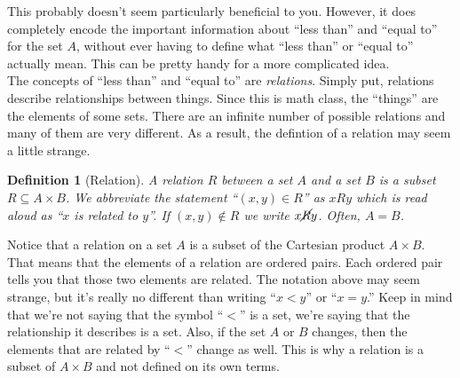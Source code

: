 \documentclass[12 pt]{article}
\newcommand{\esub}{\subseteq}
\theoremstyle{definition}
\theoremstyle{plain}
\theoremstyle{mytheorem}
\theoremstyle{myexample}
\theoremstyle{mydefinition}
\newtheorem*{definition*}{Definition}
\begin{document}
This probably doesn't seem particularly beneficial to you.  However, it does completely encode the important information about ``less than'' and ``equal to'' for the set $A$, without ever having to define what ``less than'' or ``equal to'' actually mean.  This can be pretty handy for a more complicated idea.\\

The concepts of ``less than'' and ``equal to'' are \textit{relations}.  Simply put, relations describe relationships between things.  Since this is math class, the ``things'' are the elements of some sets.  There are an infinite number of possible relations and many of them are very different.  As a result, the defintion of a relation may seem a little strange.

\begin{definition*}[Relation]  A \textit{relation} $R$ between a set $A$ and a set $B$ is a subset $R \esub A \times B$.  We abbreviate the statement ``$(x,y) \in R$'' as $x R y$ which is read aloud as ``$x$ is related to $y$''.  If $(x,y) \notin R$ we write $x \cancel{R} y$.  Often, $A=B$.
\end{definition*}

Notice that a relation on a set $A$ is a subset of the Cartesian product $A \times B$.  That means that the elements of a relation are ordered pairs.  Each ordered pair tells you that those two elements are related.  The notation above may seem strange, but it's really no different than writing ``$x<y$'' or ``$x=y$.''  Keep in mind that we're not saying that the symbol ``$<$'' is a set, we're saying that the relationship it describes is a set.  Also, if the set $A$ or $B$ changes, then the elements that are related by ``$<$'' change as well.  This is why a relation is a subset of $A \times B$ and not defined on its own terms.
\end{document}
